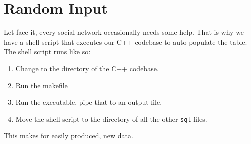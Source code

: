 \section{Random Input}
Let face it, every social network occasionally needs some help. That is why we have a shell script that executes our C++ codebase to auto-populate the table. The shell script runs like so:

\begin{enumerate}
    \item Change to the directory of the C++ codebase.
    \item Run the makefile
    \item Run the executable, pipe that to an output file.
    \item Move the shell script to the directory of all the other \texttt{sql} files.
\end{enumerate}

This makes for easily produced, new data.